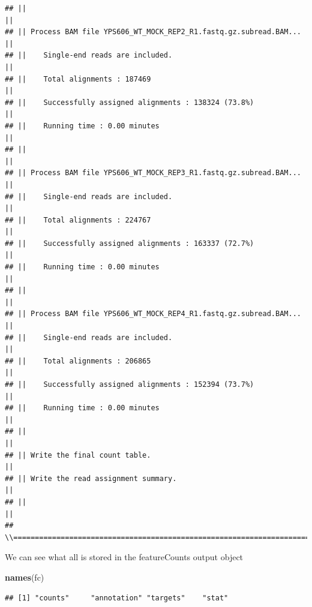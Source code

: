 \documentclass[
]{book}
\newenvironment{Shaded}{\begin{snugshade}}{\end{snugshade}}
\newcommand{\FunctionTok}[1]{\textcolor[rgb]{0.13,0.29,0.53}{\textbf{#1}}}
\newcommand{\NormalTok}[1]{#1}
\begin{document}
\begin{verbatim}
## ||                                                                            ||
## || Process BAM file YPS606_WT_MOCK_REP2_R1.fastq.gz.subread.BAM...            ||
## ||    Single-end reads are included.                                          ||
## ||    Total alignments : 187469                                               ||
## ||    Successfully assigned alignments : 138324 (73.8%)                       ||
## ||    Running time : 0.00 minutes                                             ||
## ||                                                                            ||
## || Process BAM file YPS606_WT_MOCK_REP3_R1.fastq.gz.subread.BAM...            ||
## ||    Single-end reads are included.                                          ||
## ||    Total alignments : 224767                                               ||
## ||    Successfully assigned alignments : 163337 (72.7%)                       ||
## ||    Running time : 0.00 minutes                                             ||
## ||                                                                            ||
## || Process BAM file YPS606_WT_MOCK_REP4_R1.fastq.gz.subread.BAM...            ||
## ||    Single-end reads are included.                                          ||
## ||    Total alignments : 206865                                               ||
## ||    Successfully assigned alignments : 152394 (73.7%)                       ||
## ||    Running time : 0.00 minutes                                             ||
## ||                                                                            ||
## || Write the final count table.                                               ||
## || Write the read assignment summary.                                         ||
## ||                                                                            ||
## \\============================================================================//
\end{verbatim}

We can see what all is stored in the featureCounts output object

\begin{Shaded}
\begin{Highlighting}[]
\FunctionTok{names}\NormalTok{(fc)}
\end{Highlighting}
\end{Shaded}

\begin{verbatim}
## [1] "counts"     "annotation" "targets"    "stat"
\end{verbatim}
\end{document}
